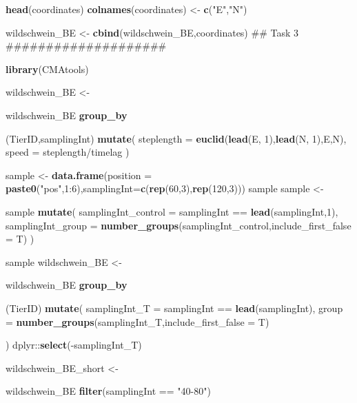 \documentclass[]{book}
\newenvironment{Shaded}{\begin{snugshade}}{\end{snugshade}}
\newcommand{\KeywordTok}[1]{\textcolor[rgb]{0.13,0.29,0.53}{\textbf{{#1}}}}
\newcommand{\DataTypeTok}[1]{\textcolor[rgb]{0.13,0.29,0.53}{{#1}}}
\newcommand{\DecValTok}[1]{\textcolor[rgb]{0.00,0.00,0.81}{{#1}}}
\newcommand{\StringTok}[1]{\textcolor[rgb]{0.31,0.60,0.02}{{#1}}}
\newcommand{\NormalTok}[1]{{#1}}
\theoremstyle{definition}
\theoremstyle{definition}
\theoremstyle{definition}
\theoremstyle{remark}
\begin{document}
\begin{Shaded}
\begin{Highlighting}[]
{{{{{{{{{{\KeywordTok{head}\NormalTok{(coordinates)}
\KeywordTok{colnames}\NormalTok{(coordinates) <-}\StringTok{ }\KeywordTok{c}\NormalTok{(}\StringTok{"E"}\NormalTok{,}\StringTok{"N"}\NormalTok{)}

\NormalTok{wildschwein_BE <-}\StringTok{ }\KeywordTok{cbind}\NormalTok{(wildschwein_BE,coordinates)}
\NormalTok{## Task 3 ####################}

\KeywordTok{library}\NormalTok{(CMAtools)}

\NormalTok{wildschwein_BE <-}\StringTok{ }\NormalTok{wildschwein_BE %
\StringTok{  }\KeywordTok{group_by}\NormalTok{(TierID,samplingInt) %
\StringTok{  }\KeywordTok{mutate}\NormalTok{(}
    \DataTypeTok{steplength =} \KeywordTok{euclid}\NormalTok{(}\KeywordTok{lead}\NormalTok{(E, }\DecValTok{1}\NormalTok{),}\KeywordTok{lead}\NormalTok{(N, }\DecValTok{1}\NormalTok{),E,N),}
    \DataTypeTok{speed =} \NormalTok{steplength/timelag}
  \NormalTok{)}



\NormalTok{sample <-}\StringTok{ }\KeywordTok{data.frame}\NormalTok{(}\DataTypeTok{position =} \KeywordTok{paste0}\NormalTok{(}\StringTok{"pos"}\NormalTok{,}\DecValTok{1}\NormalTok{:}\DecValTok{6}\NormalTok{),}\DataTypeTok{samplingInt=}\KeywordTok{c}\NormalTok{(}\KeywordTok{rep}\NormalTok{(}\DecValTok{60}\NormalTok{,}\DecValTok{3}\NormalTok{),}\KeywordTok{rep}\NormalTok{(}\DecValTok{120}\NormalTok{,}\DecValTok{3}\NormalTok{)))}
\NormalTok{sample}
\NormalTok{sample <-}\StringTok{ }\NormalTok{sample %
\StringTok{  }\KeywordTok{mutate}\NormalTok{(}
    \DataTypeTok{samplingInt_control =} \NormalTok{samplingInt ==}\StringTok{ }\KeywordTok{lead}\NormalTok{(samplingInt,}\DecValTok{1}\NormalTok{),}
    \DataTypeTok{samplingInt_group =} \KeywordTok{number_groups}\NormalTok{(samplingInt_control,}\DataTypeTok{include_first_false =} \NormalTok{T)}
  \NormalTok{)}

\NormalTok{sample}
\NormalTok{wildschwein_BE <-}\StringTok{ }\NormalTok{wildschwein_BE %
\StringTok{  }\KeywordTok{group_by}\NormalTok{(TierID) %
\StringTok{  }\KeywordTok{mutate}\NormalTok{(}
    \DataTypeTok{samplingInt_T =} \NormalTok{samplingInt ==}\StringTok{ }\KeywordTok{lead}\NormalTok{(samplingInt),}
    \DataTypeTok{group =} \KeywordTok{number_groups}\NormalTok{(samplingInt_T,}\DataTypeTok{include_first_false =} \NormalTok{T)}
  \NormalTok{) %
\StringTok{  }\NormalTok{dplyr::}\KeywordTok{select}\NormalTok{(-samplingInt_T)}

\NormalTok{wildschwein_BE_short <-}\StringTok{ }\NormalTok{wildschwein_BE %
\StringTok{  }\KeywordTok{filter}\NormalTok{(samplingInt ==}\StringTok{ "40-80"}\NormalTok{)}

}}}}}}}}}}}}}}}}}
\end{Highlighting}
\end{Shaded}
\end{document}
